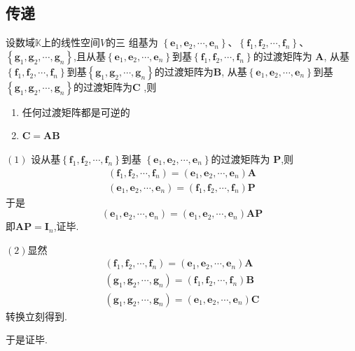 \subsection{传递}
\begin{formal}
\begin{theorem}[过渡矩阵的可逆性与复合性质]\label{thm:过渡矩阵的可逆性与复合性质}
    设数域$\mathbb{K}$上的线性空间$V$的三
    组基为
    $\left\{
        \bm{e}_1,\bm{e}_2,\cdots
        ,\bm{e}_n
    \right\}$、$
    \left\{
        \bm{f}_1,\bm{f}_2,\cdots,
        \bm{f}_n
    \right\}$、$
    \left\{
        \bm{g}_1,\bm{g}_2,\cdots
        ,\bm{g}_n
    \right\}$,且从基$\left\{
        \bm{e}_1,\bm{e}_2,\cdots
        ,\bm{e}_n
    \right\}$到基$
    \left\{
        \bm{f}_1,\bm{f}_2,\cdots,
        \bm{f}_n
    \right\}$的过渡矩阵为
    $\bm{A}$,
    从基$
    \left\{
        \bm{f}_1,\bm{f}_2,\cdots,
        \bm{f}_n
    \right\}$到基$
    \left\{
        \bm{g}_1,\bm{g}_2,\cdots
        ,\bm{g}_n
    \right\}$的过渡矩阵为$
    \bm{B}$,
    从基$
    \left\{
        \bm{e}_1,\bm{e}_2,\cdots,
        \bm{e}_n
    \right\}$到基$
    \left\{
        \bm{g}_1,\bm{g}_2,\cdots
        ,\bm{g}_n
    \right\}$的过渡矩阵为$
    \bm{C}$
    ,则
    \begin{enumerate}[label=\textup{(\arabic*)}]
        \item 任何过渡矩阵都是可逆的
        \item $\bm{C} = \bm{AB}$
    \end{enumerate}
\end{theorem}
\newpage
\begin{Proof}$(1)$
设从基$\left\{
        \bm{f}_1,\bm{f}_2,\cdots,
        \bm{f}_n
    \right\}$到基
    $\left\{
        \bm{e}_1,\bm{e}_2,\cdots,
        \bm{e}_n
    \right\}$的过渡矩阵为
    $\bm{P}$,则
    \begin{align*}
        \left(\bm{f}_1,\bm{f}_2,\cdots,\bm{f}_n\right)=\left(\bm{e}_1,\bm{e}_2,\cdots,\bm{e}_n\right)\bm{A}\\
        \left(\bm{e}_1,\bm{e}_2,\cdots,\bm{e}_n
        \right)=\left(\bm{f}_1,\bm{f}_2,\cdots,\bm{f}_n\right)\bm{P}
    \end{align*}
    于是
    \[
    \left(\bm{e}_1,\bm{e}_2,\cdots,\bm{e}_n
        \right)=\left(\bm{e}_1,\bm{e}_2,\cdots,\bm{e}_n
        \right)\bm{AP}
    \]
    即$\bm{AP}=\bm{I}_n$,证毕.

    $(2)$显然
    \begin{align*}
        \left(\bm{f}_1,\bm{f}_2,\cdots,\bm{f}_n\right)=\left(\bm{e}_1,\bm{e}_2,\cdots,\bm{e}_n\right)\bm{A}\\
        \left(\bm{g}_1,\bm{g}_2,\cdots,\bm{g}_n\right)=\left(\bm{f}_1,\bm{f}_2,\cdots,\bm{f}_n\right)\bm{B}\\
        \left(\bm{g}_1,\bm{g}_2,\cdots,\bm{g}_n\right)=\left(\bm{e}_1,\bm{e}_2,\cdots,\bm{e}_n\right)\bm{C}
    \end{align*}
    转换立刻得到.

    于是证毕.
\end{Proof}
\end{formal}
